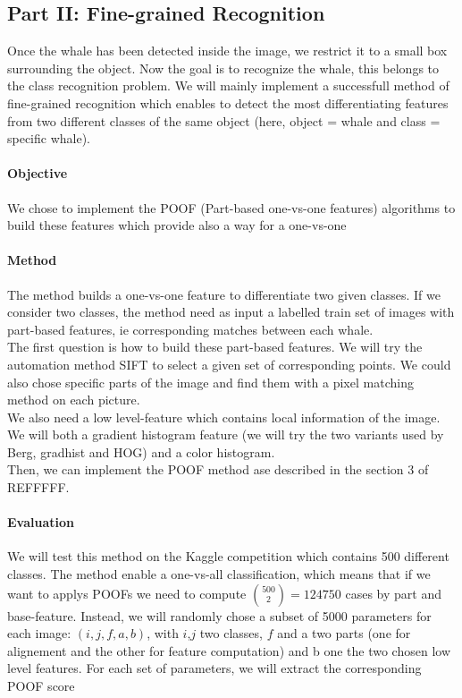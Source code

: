 \documentclass[11pt,a4paper,oneside]{report}
\begin{document}
\subsection*{Part II: Fine-grained Recognition}
Once the whale has been detected inside the image, we restrict it to a small box surrounding the object. Now the goal is to recognize the whale, this belongs to the class recognition problem. We will mainly implement a successfull method of fine-grained recognition which enables to detect the most differentiating features from two different classes of the same object (here, object = whale and class = specific whale).

\paragraph{Objective}

We chose to implement the POOF (Part-based one-vs-one features) algorithms to build these features which provide also a way for a one-vs-one

\paragraph{Method}

The method builds a one-vs-one feature to differentiate two given classes.
If we consider two classes, the method need as input a labelled train set of images with part-based features, ie corresponding matches between each whale.\\

The first question is how to build these part-based features. We will try the automation method SIFT to select a given set of corresponding points. We could also chose specific parts of the image and find them with a pixel matching method on each picture.\\

We also need a low level-feature which contains local information of the image. We will both a gradient histogram feature (we will try the two variants used by Berg, gradhist and HOG) and a color histogram.\\

Then, we can implement the POOF method ase described in the section 3 of REFFFFF.

\paragraph{Evaluation}

We will test this method on the Kaggle competition which contains 500 different classes. The method enable a one-vs-all classification, which means that if we want to applys POOFs we need to compute $\binom{500}{2} = 124 750$ cases by part and base-feature. Instead, we will randomly chose a subset of 5000 parameters for each image: $(i,j,f,a,b)$, with $i$,$j$ two classes, $f$ and a two parts (one for alignement and the other for feature computation) and b one the two chosen low level features. For each set of parameters, we will extract the corresponding POOF score\\
\end{document}
